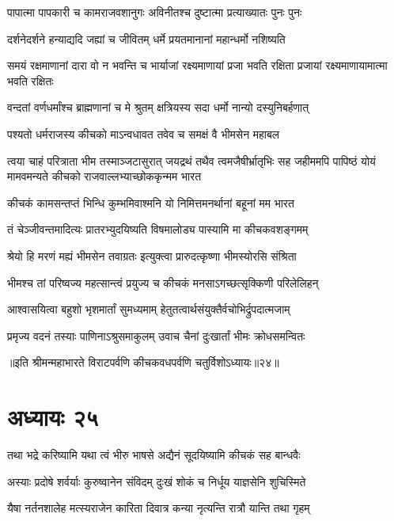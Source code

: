 \twolineshloka
{पापात्मा पापकारी च कामराजवशानुगः}
{अविनीतश्च दुष्टात्मा प्रत्याख्यातः पुनः पुनः}


\twolineshloka
{दर्शनेदर्शने हन्याद्यदि जह्यां च जीवितम्}
{धर्मे प्रयतमानानां महान्धर्मो नशिष्यति}


\threelineshloka
{समयं रक्षमाणानां दारा वो न भवन्ति च}
{भार्याजां रक्ष्यमाणायां प्रजा भवति रक्षिता}
{प्रजायां रक्ष्यमाणायामात्मा भवति रक्षितः}


\twolineshloka
{वन्दतां वर्णधर्मांश्च ब्राह्मणानां च मे श्रुतम्}
{क्षत्रियस्य सदा धर्मो नान्यो दस्युनिबर्हणात्}


\twolineshloka
{पश्यतो धर्मराजस्य कीचको माऽन्वधावत}
{तवेव च समक्षं वै भीमसेन महाबल}


\onelineshloka
{त्वया चाहं परित्राता भीम तस्माञ्जटासुरात्}
\threelineshloka
{जयद्रथं तथैव त्वमजैषीर्भ्रातृभिः सह}
{जहीममपि पापिष्ठं योयं मामवमन्यते}
{कीचको राजवाल्लभ्याच्छोककृन्मम भारत}


\twolineshloka
{कीचकं कामसन्तप्तं भिन्धि कुम्भमिवाश्मनि}
{यो निमित्तमनर्थानां बहूनां मम भारत}


\twolineshloka
{तं चेञ्जीवन्तमादित्यः प्रातरभ्युदयिष्यति}
{विषमालोड्य पास्यामि मा कीचकवशङ्गमम्}


\twolineshloka
{श्रेयो हि मरणं मह्यं भीमसेन तवाग्रतः}
{इत्युक्त्वा प्रारुदत्कृष्णा भीमस्योरसि संश्रिता}


\twolineshloka
{भीमश्च तां परिष्वज्य महत्सान्त्वं प्रयुज्य च}
{कीचकं मनसाऽगच्छत्सृक्किणी परिलेलिहन्}


\twolineshloka
{आश्वासयित्वा बहुशो भृशमार्तां सुमध्यमाम्}
{हेतुतत्वार्थसंयुक्तैर्वचोभिर्द्रुपदात्मजाम्}


\twolineshloka
{प्रमृज्य वदनं तस्याः पाणिनाऽश्रुसमाकुलम्}
{उवाच चैनां दुःखार्तां भीमः क्रोधसमन्वितः}

॥इति श्रीमन्महाभारते विराटपर्वणि कीचकवधपर्वणि चतुर्विशोऽध्यायः॥२४॥

\chapter{अध्यायः २५}

\twolineshloka
{तथा भद्रे करिष्यामि यथा त्वं भीरु भाषसे}
{अद्यैनं सूदयिष्यामि कीचकं सह बान्धवैः}


\twolineshloka
{अस्याः प्रदोषे शर्वर्याः कुरुष्वानेन संविदम्}
{दुःखं शोकं च निर्धूय याज्ञसेनि शुचिस्मिते}


\twolineshloka
{यैषा नर्तनशालेह मत्स्यराजेन कारिता}
{दिवात्र कन्या नृत्यन्ति रात्रौ यान्ति तथा गृहम्}


